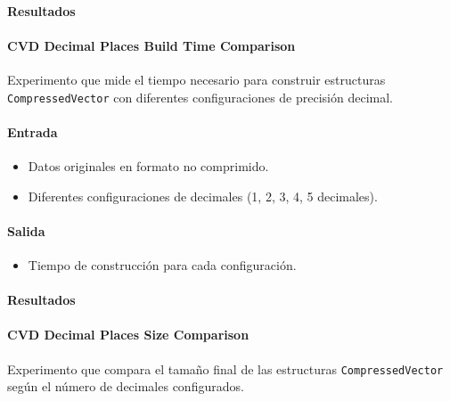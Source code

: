 \paragraph{Resultados}
\vspace{0.5em}
\noindent

\CVDDecimalPlacesAccessTimeComparison

\paragraph{CVD Decimal Places Build Time Comparison}
\label{cvd_decimal_places_build_time}

Experimento que mide el tiempo necesario para construir estructuras \texttt{CompressedVector} con diferentes configuraciones de precisión decimal.

\paragraph{Entrada}
\begin{itemize}
    \item Datos originales en formato no comprimido.
    \item Diferentes configuraciones de decimales (1, 2, 3, 4, 5 decimales).
\end{itemize}

\paragraph{Salida}
\begin{itemize}
    \item Tiempo de construcción para cada configuración.
\end{itemize}

\paragraph{Resultados}
\vspace{0.5em}
\noindent

\CVDDecimalPlacesBuildTimeComparison

\paragraph{CVD Decimal Places Size Comparison}
\label{cvd_decimal_places_size}

Experimento que compara el tamaño final de las estructuras \texttt{CompressedVector} según el número de decimales configurados.

